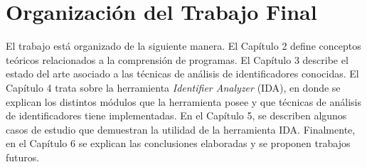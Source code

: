 
\section{Organización del Trabajo Final}

El trabajo está organizado de la siguiente manera. El Capítulo 2 define conceptos teóricos relacionados a la comprensión de programas. El Capítulo 3 describe el estado del arte asociado a las técnicas de análisis de identificadores conocidas. El Capítulo 4 trata sobre la herramienta \textit{Identifier Analyzer} (IDA), en donde se explican los distintos módulos que la herramienta posee y que técnicas de análisis de identificadores tiene implementadas. En el Capítulo 5, se describen algunos casos de estudio que demuestran la utilidad de la herramienta IDA.
Finalmente, en el Capítulo 6 se explican las conclusiones elaboradas y se proponen trabajos futuros.

\newpage %